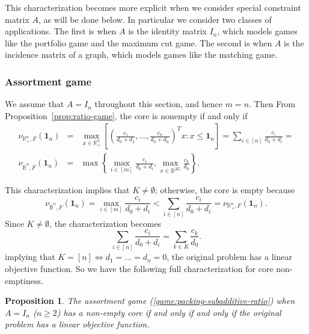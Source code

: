 \documentclass[11pt]{article}\usepackage[]{graphicx}\usepackage[]{xcolor}
\newtheorem{prop}{Proposition}
\begin{document}
This characterization becomes more explicit when we consider special constraint matrix $A$, as will be done below. In particular we consider two classes of applications. The first is when $A$ is the identity matrix $I_{n}$, which models games like the portfolio game and the maximum cut game. The second is when $A$ is the incidence matrix of a graph, which models games like the matching game. 






\subsubsection{Assortment game}


We assume that $A=I_{n}$ throughout this section, and hence $m=n$. Then From Proposition~\ref{prop:ratio-game}, the core is nonempty if and only if
\begin{eqnarray*}
\nu_{\mathbb{R}^n_{+},F}\left(\mathbf{1}_n\right)&=&\max\limits_{x\in \mathbb{R}^n_{+}} \left[\left(\frac{c_1}{d_0+d_1},\ldots,\frac{c_n}{d_0+d_n}\right)^T x: x\le \mathbf{1}_n\right]=\sum_{i\in [n]}\frac{c_i}{d_0+d_i}=\\
\nu_{\overline{\mathbb{B}}^n, F}\left(\mathbf{1}_n\right)&=&\max\left\{\max\limits_{i\in [m]} \frac{c_i}{d_0+d_i}, \max\limits_{x\in \mathbb{B}^{|K|}} \frac{c_k}{d_0}\right\}.
\end{eqnarray*}

This characterization implies that $K\ne \emptyset$; otherwise, the core is empty because
\[
\nu_{\overline{\mathbb{B}}^n, F}\left(\mathbf{1}_n\right)=\max\limits_{i\in [m]} \frac{c_i}{d_0+d_i}<\sum_{i\in [n]}\frac{c_i}{d_0+d_i}=\nu_{\mathbb{R}^n_{+},F}\left(\mathbf{1}_n\right). 
\]
Since $K\ne \emptyset$, the characterization becomes 
\[
\sum_{i\in [n]}\frac{c_i}{d_0+d_i}=\sum_{k\in K}\frac{c_k}{d_0}. 
\]
implying that $K=[n]\iff d_1=\dots=d_n=0$, the original problem has a linear objective function. So we have the following full characterization for core non-emptiness.
 \begin{prop}\label{prop:ratio-assortment-game} The assortment game (\ref{game:packing-subadditive-ratio}) when $A=I_n$ ($n\ge 2$) has a non-empty core if and only if and only if the original problem has a linear objective function.
 \end{prop}
\end{document}
